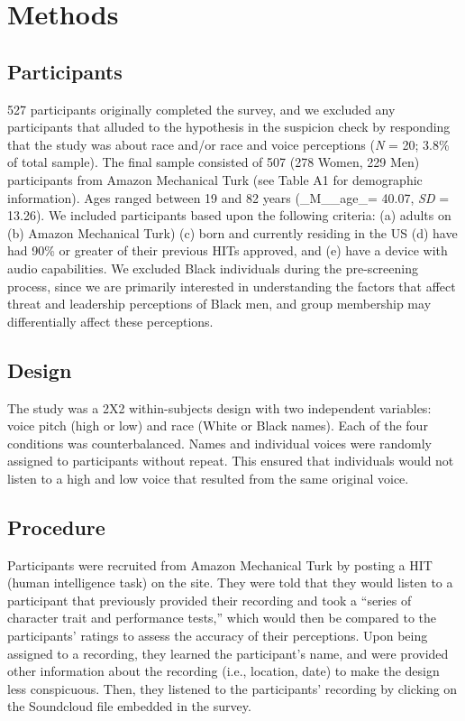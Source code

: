 \documentclass[
  english,
  man]{apa6}
\begin{document}
\hypertarget{methods}{%
\section{Methods}\label{methods}}

\hypertarget{participants}{%
\subsection{Participants}\label{participants}}

527 participants originally completed the survey, and we excluded any participants that alluded to the hypothesis in the suspicion check by responding that the study was about race and/or race and voice perceptions (\emph{N} = 20; 3.8\% of total sample). The final sample consisted of 507 (278 Women, 229 Men) participants from Amazon Mechanical Turk (see Table A1 for demographic information). Ages ranged between 19 and 82 years (\_M\_\_age\_= 40.07, \emph{SD} = 13.26). We included participants based upon the following criteria: (a) adults on (b) Amazon Mechanical Turk) (c) born and currently residing in the US (d) have had 90\% or greater of their previous HITs approved, and (e) have a device with audio capabilities. We excluded Black individuals during the pre-screening process, since we are primarily interested in understanding the factors that affect threat and leadership perceptions of Black men, and group membership may differentially affect these perceptions.

\hypertarget{design}{%
\subsection{Design}\label{design}}

The study was a 2X2 within-subjects design with two independent variables: voice pitch (high or low) and race (White or Black names). Each of the four conditions was counterbalanced. Names and individual voices were randomly assigned to participants without repeat. This ensured that individuals would not listen to a high and low voice that resulted from the same original voice.

\hypertarget{procedure}{%
\subsection{Procedure}\label{procedure}}

Participants were recruited from Amazon Mechanical Turk by posting a HIT (human intelligence task) on the site. They were told that they would listen to a participant that previously provided their recording and took a \enquote{series of character trait and performance tests,} which would then be compared to the participants' ratings to assess the accuracy of their perceptions. Upon being assigned to a recording, they learned the participant's name, and were provided other information about the recording (i.e., location, date) to make the design less conspicuous. Then, they listened to the participants' recording by clicking on the Soundcloud file embedded in the survey.
\end{document}
